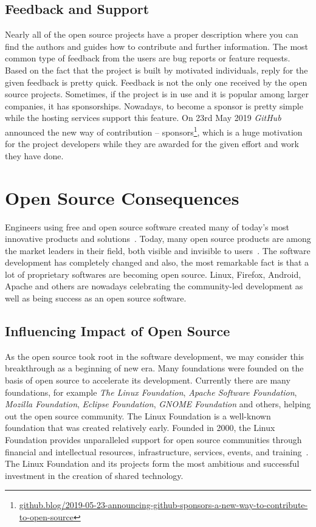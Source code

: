\documentclass[12pt,a4paper]{article}
\theoremstyle{definition}
\begin{document}
    \subsection{Feedback and Support}

    Nearly all of the open source projects have a proper description where you can find the authors and guides how to contribute and further information. The most common type of feedback from the users are bug reports or feature requests. Based on the fact that the project is built by motivated individuals, reply for the given feedback is pretty quick. Feedback is not the only one received by the open source projects. Sometimes, if the project is in use and it is popular among larger companies, it has sponsorships. Nowadays, to become a sponsor is pretty simple while the hosting services support this feature. On 23rd May 2019 \textit{GitHub} announced the new way of contribution -- sponsors\footnote{\href{https://github.blog/2019-05-23-announcing-github-sponsors-a-new-way-to-contribute-to-open-source/}{github.blog/2019-05-23-announcing-github-sponsors-a-new-way-to-contribute-to-open-source}}, which is a huge motivation for the project developers while they are awarded for the given effort and work they have done.

\section{Open Source Consequences}

    Engineers using free and open source software created many of today's most innovative products and solutions~\cite{4163037}. Today, many open source products are among the market leaders in their field, both visible and invisible to users~\cite{7217776}. The software development has completely changed and also, the most remarkable fact is that a lot of proprietary softwares are becoming open source. Linux, Firefox, Android, Apache and others are nowadays celebrating the community-led development as well as being success as an open source software.

    \subsection{Influencing Impact of Open Source}

    As the open source took root in the software development, we may consider this breakthrough as a beginning of new era. Many foundations were founded on the basis of open source to accelerate its development. Currently there are many foundations, for example \textit{The Linux Foundation}, \textit{Apache Software Foundation}, \textit{Mozilla Foundation}, \textit{Eclipse Foundation}, \textit{GNOME Foundation} and others, helping out the open source community. The Linux Foundation is a well-known foundation that was created relatively early. Founded in 2000, the Linux Foundation provides unparalleled support for open source communities through financial and intellectual resources, infrastructure, services, events, and training~\cite{TLF-about}. The Linux Foundation and its projects form the most ambitious and successful investment in the creation of shared technology\cite{TLF-about}.\\
\end{document}
